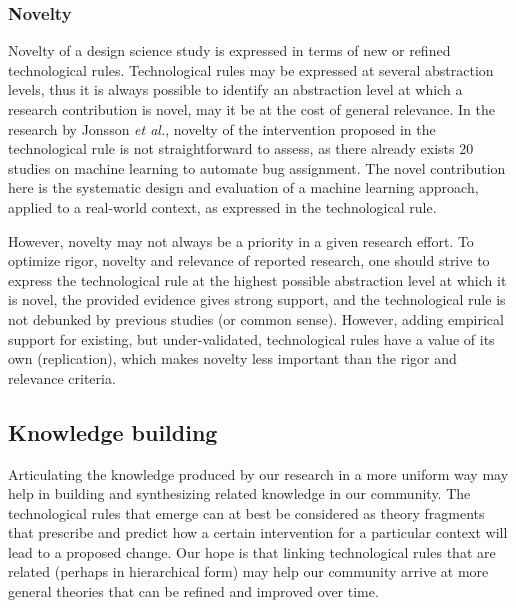 \documentclass[graybox]{svmult}
\newcommand{\peggy}[1]{\textcolor{blue}{{\it [Peggy says: #1]}}}
\newcommand{\peggy}[1]{}
\begin{document}
\subsubsection{Novelty} 
Novelty of a design science study is expressed in terms of new or refined technological rules. Technological rules may be expressed at several abstraction levels, thus it is always possible to identify an abstraction level at which a research contribution is novel, may it be at the cost of general relevance. In the research by Jonsson \emph{et al.}, novelty of the intervention proposed in the technological rule is not straightforward to assess, as there already exists 20 studies on machine learning to automate bug assignment. The novel contribution here is the systematic design and evaluation of a machine learning approach, applied to a real-world context, as expressed in the technological rule.

However, novelty may not always be a priority in a given research effort.
To optimize rigor, novelty and relevance of reported research, one should strive to express the technological rule at the highest possible abstraction level at which it is novel, the provided evidence gives strong support, and the technological rule is not debunked by previous studies (or common sense). However, adding empirical support for existing, but under-validated, technological rules have a value of its own (replication), which makes novelty less important than the rigor and relevance criteria.


\subsection{Knowledge building}
\label{sec:knowledge}

Articulating the knowledge produced by our research in a more uniform way may help in building and synthesizing related knowledge in our community. 
The technological rules that emerge can at best be considered as theory fragments that prescribe and predict how a certain intervention for a particular context will lead to a proposed change. 
Our hope is that linking technological rules that are related (perhaps in hierarchical form) may help our community arrive at more general theories that can be refined and improved over time.
\end{document}
